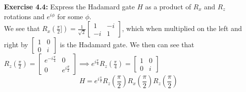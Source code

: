 \documentclass{article}
\begin{document}
\begin{tcolorbox}\textbf{Exercise 4.4:}
Express the Hadamard gate $H$ as a product of $R_x$ and $R_z$ rotations and $e^{i\phi}$ for some $\phi$.\\
	We see that $R_x(\frac{\pi}{2}]) = \frac{1}{\sqrt{2}}\begin{bmatrix} 1 & -i \\ -i & 1\end{bmatrix}$, which when multiplied on the left and right by $\begin{bmatrix} 1 & 0 \\ 0 & i\end{bmatrix}$ is the Hadamard gate. We then can see that $R_z(\frac{\pi}{2})  = \begin{bmatrix} e^{-i\frac{\pi}{4}} & 0 \\ 0 & e^{i\frac{\theta}{2}}\end{bmatrix} \implies e^{i\frac{\pi}{4}} R_z(\frac{\pi}{4}) = \begin{bmatrix} 1 & 0 \\ 0 & i\end{bmatrix} $  
	$$H = e^{i\frac{\pi}{2}}R_z(\frac{\pi}{2})R_x(\frac{\pi}{2}) R_z(\frac{\pi}{2})$$
\end{tcolorbox}
\end{document}
